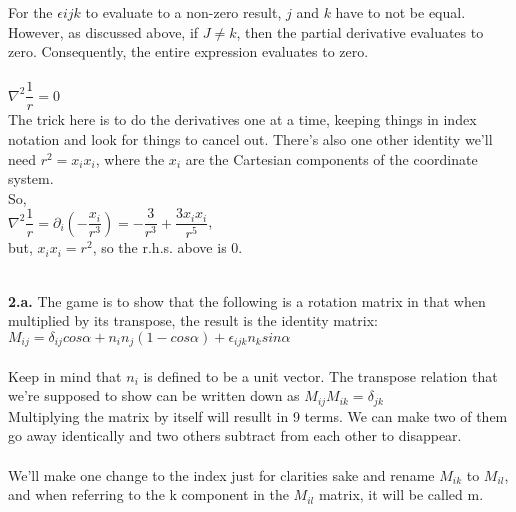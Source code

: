 \documentclass[prb,preprint]
{revtex4-1}
\begin{document}
For the $\epsilon{ijk}$ to evaluate to a non-zero result, $j$ and $k$ have to not be equal.  However, as discussed above, if $J \ne k$, then the partial derivative evaluates to zero.  Consequently, the entire expression evaluates to zero.
\\\\
$\nabla^2 \dfrac{1}{r} = 0$\\
The trick here is to do the derivatives one at a time, keeping things in index notation and look for things to cancel out.  There's also one other identity we'll need $r^2 = x_i x_i$, where the $x_i$ are the Cartesian components of the coordinate system.
\\
So,
\\
$\nabla^2 \dfrac{1}{r} = \partial_i \left(- \dfrac{x_i}{r^3}\right) = -\dfrac{3}{r^3} + \dfrac{3x_i x_i}{r^5}$,
\\
but, $x_i x_i = r^2$, so the r.h.s. above is 0.
\\\\


\newpage

{\bf 2.a.} The game is to show that the following is a rotation matrix in that when multiplied by its transpose, the result is the identity matrix:\\
$M_{ij} = \delta_{ij}cos \alpha + n_i n_j \left(1 - cos \alpha\right) + \epsilon_{ijk}n_k sin \alpha$
\\\\
Keep in mind that $n_i$ is defined to be a unit vector.  The transpose relation that we're supposed to show can be written down as $M_{ij}M_{ik} = \delta_{jk}$\\


Multiplying the matrix by itself will resullt in 9 terms.  We can make two of them go away identically and two others subtract from each other to disappear.\\\\

We'll make one change to the index just for clarities sake and rename $M_{ik}$ to $M_{il}$, and when referring to the k component in the $M_{il}$ matrix, it will be called m.
\end{document}
